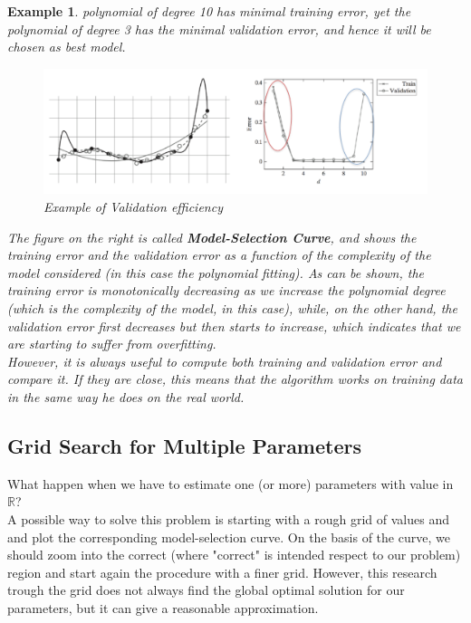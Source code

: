 \documentclass[12pt]{report}
\theoremstyle{plain}
\newtheorem{example}{Example}[chapter]
\begin{document}
\begin{flushleft}
\begin{example}
	polynomial of degree 10 has minimal training error, yet the polynomial of 
	degree 3 has the minimal validation error, and hence it will be chosen as 
	best model.
	\begin{figure}[!h]
		\includegraphics[scale=0.7]{images/ex_validation_set.pdf}
		\caption{Example of Validation efficiency}
		\label{fig:ex_val}
	\end{figure}
	The figure on the right is called \textbf{Model-Selection Curve}, and shows 
	the training error and the validation error as a function of the complexity 
	of the model considered (in this case the polynomial fitting). As can be 
	shown, the training error is monotonically decreasing as we increase the 
	polynomial degree (which is the complexity of the model, in this case), 
	while, on the other hand, the validation error first decreases but then 
	starts to increase, which indicates that we are starting to suffer from 
	overfitting.\\
	However, it is always useful to compute both training and validation error 
	and compare it. If they are close, this means that the algorithm works on 
	training data in the same way he does on the real world.
\end{example}

\subsection{Grid Search for Multiple Parameters}
What happen when we have to estimate one (or more) parameters with value in 
$\mathds{R}$?\\
A possible way to solve this problem is starting with a rough grid of values 
and and plot the corresponding model-selection curve. On the basis of the 
curve, we should zoom into the correct (where "correct" is intended respect to 
our problem) region and start again the procedure with a finer grid. However, 
this research trough the grid does not always find the global optimal solution 
for our parameters, but it can give a reasonable approximation.


\end{flushleft}
\end{document}
